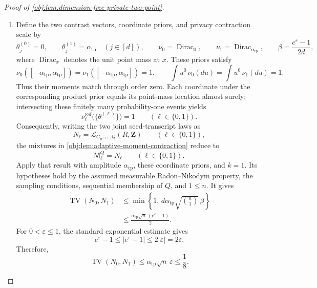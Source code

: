 \begin{proof}[Proof of \cref{obj:lem:dimension-free-private-two-point}]
\begin{enumerate}
\item Define the two contrast vectors, coordinate priors, and privacy contraction scale by
\[
\theta^{(0)}_j=0,\qquad
\theta^{(1)}_j=\alpha_{\mathrm{tp}}
\quad(j\in[d]),
\qquad
\nu_0=\operatorname{Dirac}_0,\qquad
\nu_1=\operatorname{Dirac}_{\alpha_{\mathrm{tp}}},
\qquad
\beta=\frac{e^\varepsilon-1}{2d},
\]
where \(\operatorname{Dirac}_x\) denotes the unit point mass at \(x\).
These priors satisfy
\[
\nu_0([-\alpha_{\mathrm{tp}},\alpha_{\mathrm{tp}}])
=\nu_1([-\alpha_{\mathrm{tp}},\alpha_{\mathrm{tp}}])=1,
\qquad
\int u^0\,\nu_0(du)=\int u^0\,\nu_1(du)=1.
\]
Thus their moments match through order zero. Each coordinate under the corresponding product prior equals its point-mass location almost surely; intersecting these finitely many probability-one events yields
\[
\nu_\ell^{\otimes d}\bigl(\{\theta^{(\ell)}\}\bigr)=1
\qquad(\ell\in\{0,1\}).
\]
Consequently, writing the two joint seed-transcript laws as
\[
N_\ell=\mathcal L_{G_{\theta^{(\ell)}},Q}(R,\mathbf Z)
\qquad(\ell\in\{0,1\}),
\]
the mixtures in \cref{obj:lem:adaptive-moment-contraction} reduce to
\[
\mathsf M_\ell^Q=N_\ell
\qquad(\ell\in\{0,1\}).
\]
Apply that result with amplitude \(\alpha_{\mathrm{tp}}\), these coordinate priors, and \(k=1\). Its hypotheses hold by the assumed measurable Radon--Nikodym property, the sampling conditions, sequential membership of \(Q\), and \(1\le n\). It gives
\[
\begin{aligned}
\operatorname{TV}(N_0,N_1)
&\le
\min\left\{1,\,
d\alpha_{\mathrm{tp}}\sqrt{\binom n1}\,\beta\right\}\\
&\le
\frac{\alpha_{\mathrm{tp}}\sqrt n\,(e^\varepsilon-1)}2.
\end{aligned}
\]
For \(0<\varepsilon\le1\), the standard exponential estimate gives
\[
e^\varepsilon-1
\le |e^\varepsilon-1|
\le2|\varepsilon|
=2\varepsilon.
\]
Therefore,
\[
\operatorname{TV}(N_0,N_1)
\le\alpha_{\mathrm{tp}}\sqrt n\,\varepsilon
\le\frac18.
\]


\end{enumerate}
\end{proof}
